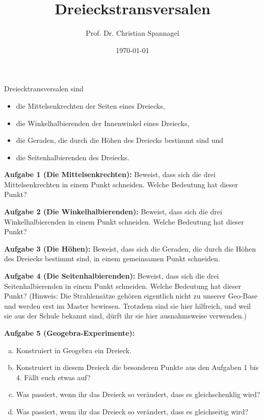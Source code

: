 \documentclass{cssheet}
\title{Dreieckstransversalen}
\author{Prof. Dr. Christian Spannagel}
\date{\today}
\begin{document}
\printtitle

Dreiecktransversalen sind
\begin{itemize}
\item die Mittelsenkrechten der Seiten eines Dreiecks,
\item die Winkelhalbierenden der Innenwinkel eines Dreiecks,
\item die Geraden, die durch die Höhen des Dreiecks bestimmt sind und
\item die Seitenhalbierenden des Dreiecks.
\end{itemize}

\textbf{Aufgabe 1 (Die Mittelsenkrechten):}  Beweist, dass sich die drei Mittelsenkrechten in einem Punkt schneiden. Welche Bedeutung hat dieser Punkt?

\textbf{Aufgabe 2 (Die Winkelhalbierenden):}  Beweist, dass sich die drei Winkelhalbierenden in einem Punkt schneiden. Welche Bedeutung hat dieser Punkt?

\textbf{Aufgabe 3 (Die Höhen):}  Beweist, dass sich die Geraden, die durch die Höhen des Dreiecks bestimmt sind, in einem gemeinsamen Punkt schneiden.

\textbf{Aufgabe 4 (Die Seitenhalbierenden):}  Beweist, dass sich die drei Seitenhalbierenden in einem Punkt schneiden. Welche Bedeutung hat dieser Punkt? (Hinweis: Die Strahlensätze gehören eigentlich nicht zu unserer Geo-Base und werden erst im Master bewiesen. Trotzdem sind sie hier hilfreich, und weil sie aus der Schule bekannt sind, dürft ihr sie hier ausnahmsweise verwenden.)

\textbf{Aufgabe 5 (Geogebra-Experimente):} 
\begin{enumerate}[a)]
\item Konstruiert in Geogebra ein Dreieck.
\item Konstruiert in diesem Dreieck die besonderen Punkte aus den Aufgaben 1 bis 4. Fällt euch etwas auf?
\item Was passiert, wenn ihr das Dreieck so verändert, dass es gleichschenklig wird?
\item Was passiert, wenn ihr das Dreieck so verändert, dass es gleichseitig wird?
\end{enumerate}

\vspace*{10mm}
\printlicense

\printsocials

\end{document}
